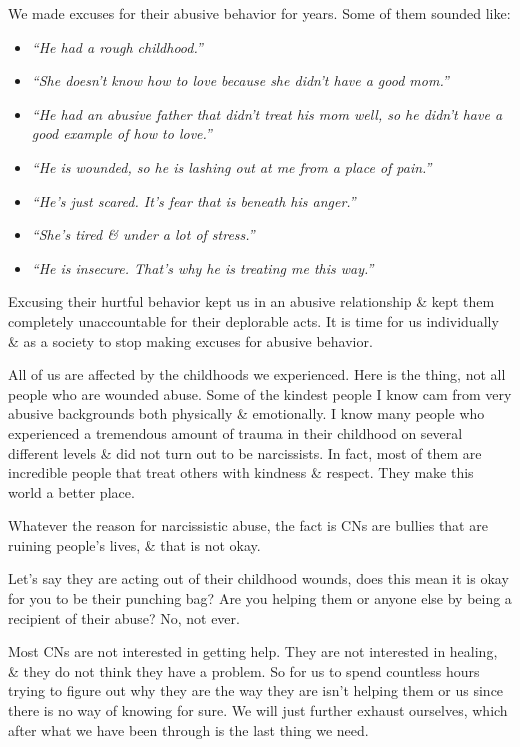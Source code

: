 \documentclass{article}
\numberwithin{equation}{section}
\begin{document}
We made excuses for their abusive behavior for years. Some of them sounded like:
\begin{itemize}
	\item \textit{``He had a rough childhood.''}
	\item \textit{``She doesn't know how to love because she didn't have a good mom.''}
	\item \textit{``He had an abusive father that didn't treat his mom well, so he didn't have a good example of how to love.''}
	\item \textit{``He is wounded, so he is lashing out at me from a place of pain.''}
	\item \textit{``He's just scared. It's fear that is beneath his anger.''}
	\item \textit{``She's tired \& under a lot of stress.''}
	\item \textit{``He is insecure. That's why he is treating me this way.''}
\end{itemize}
Excusing their hurtful behavior kept us in an abusive relationship \& kept them completely unaccountable for their deplorable acts. It is time for us individually \& as a society to stop making excuses for abusive behavior.

All of us are affected by the childhoods we experienced. Here is the thing, not all people who are wounded abuse. Some of the kindest people I know cam from very abusive backgrounds both physically \& emotionally. I know many people who experienced a tremendous amount of trauma in their childhood on several different levels \& did not turn out to be narcissists. In fact, most of them are incredible people that treat others with kindness \& respect. They make this world a better place.

Whatever the reason for narcissistic abuse, the fact is CNs are bullies that are ruining people's lives, \& that is not okay.

Let's say they are acting out of their childhood wounds, does this mean it is okay for you to be their punching bag? Are you helping them or anyone else by being a recipient of their abuse? No, not ever.

Most CNs are not interested in getting help. They are not interested in healing, \& they do not think they have a problem. So for us to spend countless hours trying to figure out why they are the way they are isn't helping them or us since there is no way of knowing for sure. We will just further exhaust ourselves, which after what we have been through is the last thing we need.
\end{document}
